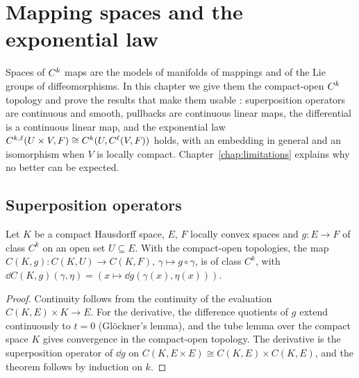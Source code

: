 \chapter{Mapping spaces and the exponential law}
\label{chap:mapping}

Spaces of $C^{k}$ maps are the models of manifolds of mappings and of the Lie groups of
diffeomorphisms. In this chapter we give them the compact-open $C^{k}$ topology and prove the
results that make them usable \cite[\S1.7]{GN26}: superposition operators are continuous and smooth,
pullbacks are continuous linear maps, the differential is a continuous linear map, and the exponential law
$C^{k,\ell}(U \times V, F) \cong C^{k}(U, C^{\ell}(V, F))$ holds, with an embedding in general
and an isomorphism when $V$ is locally compact. Chapter~\ref{chap:limitations} explains why no
better can be expected.

\section{Superposition operators}
\label{sec:pushforward}

\begin{theorem}
  \label{thm:pushforward}
  \leanok
  Let $K$ be a compact Hausdorff space, $E$, $F$ locally convex spaces and $g \colon E \to F$
  of class $C^k$ on an open set $U \subseteq E$. With the compact-open topologies, the map
  $C(K, g) \colon C(K, U) \to C(K, F)$, $\gamma \mapsto g \circ \gamma$, is of class $C^k$, with
  $\dd C(K, g)(\gamma, \eta) = (x \mapsto \dd g(\gamma(x), \eta(x)))$.
\end{theorem}

\begin{proof}
  \leanok
  Continuity follows from the continuity of the evaluation $C(K, E) \times K \to E$. For the
  derivative, the difference quotients of $g$ extend continuously to $t = 0$ (Glöckner's lemma),
  and the tube lemma over the compact space $K$ gives convergence in the compact-open topology.
  The derivative is the superposition operator of $\dd g$ on
  $C(K, E \times E) \cong C(K, E) \times C(K, E)$, and the theorem follows by induction on $k$.
\end{proof}

